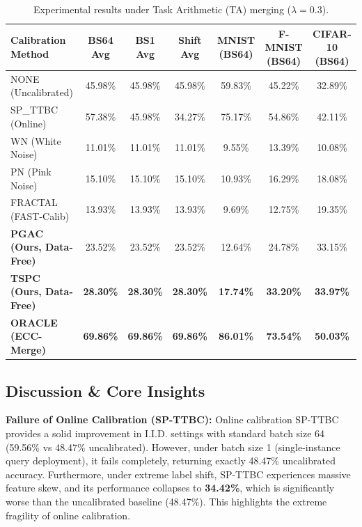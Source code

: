 \documentclass{article}
\theoremstyle{plain}
\theoremstyle{definition}
\theoremstyle{remark}
\begin{document}
\begin{table}[t]
\caption{Experimental results under Task Arithmetic (TA) merging ($\lambda=0.3$).}
\label{tab:results_ta}
\vskip 0.15in
\begin{center}
\begin{small}
\begin{sc}
\setlength{\tabcolsep}{4.5pt}
\begin{tabular}{lcccccc}
\toprule
Calibration Method & BS64 Avg & BS1 Avg & Shift Avg & MNIST (BS64) & F-MNIST (BS64) & CIFAR-10 (BS64) \\
\midrule
NONE (Uncalibrated) & 45.98\% & 45.98\% & 45.98\% & 59.83\% & 45.22\% & 32.89\% \\
SP\_TTBC (Online) & 57.38\% & 45.98\% & 34.27\% & 75.17\% & 54.86\% & 42.11\% \\
WN (White Noise) & 11.01\% & 11.01\% & 11.01\% & 9.55\% & 13.39\% & 10.08\% \\
PN (Pink Noise) & 15.10\% & 15.10\% & 15.10\% & 10.93\% & 16.29\% & 18.08\% \\
FRACTAL (FAST-Calib) & 13.93\% & 13.93\% & 13.93\% & 9.69\% & 12.75\% & 19.35\% \\
\textbf{PGAC (Ours, Data-Free)} & 23.52\% & 23.52\% & 23.52\% & 12.64\% & 24.78\% & 33.15\% \\
\textbf{TSPC (Ours, Data-Free)} & \textbf{28.30\%} & \textbf{28.30\%} & \textbf{28.30\%} & \textbf{17.74\%} & \textbf{33.20\%} & \textbf{33.97\%} \\
\textbf{ORACLE (ECC-Merge)} & \textbf{69.86\%} & \textbf{69.86\%} & \textbf{69.86\%} & \textbf{86.01\%} & \textbf{73.54\%} & \textbf{50.03\%} \\
\bottomrule
\end{tabular}
\end{sc}
\end{small}
\end{center}
\vskip -0.1in
\end{table}

\subsection{Discussion \& Core Insights}

\textbf{Failure of Online Calibration (SP-TTBC):}
Online calibration SP-TTBC provides a solid improvement in I.I.D. settings with standard batch size 64 (59.56\% vs 48.47\% uncalibrated). However, under batch size 1 (single-instance query deployment), it fails completely, returning exactly 48.47\% uncalibrated accuracy. Furthermore, under extreme label shift, SP-TTBC experiences massive feature skew, and its performance collapses to \textbf{34.42\%}, which is significantly worse than the uncalibrated baseline (48.47\%). This highlights the extreme fragility of online calibration.
\end{document}
